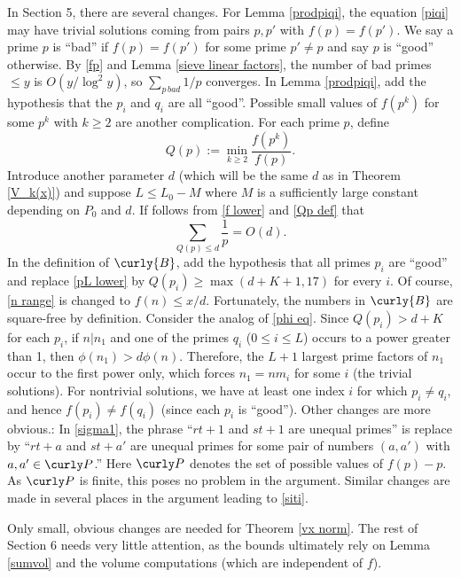\documentclass[11pt]{amsart}
\theoremstyle{remark}
\theoremstyle{plain}
\numberwithin{equation}{section}
\newcommand{\be}{\begin{equation}}
\newcommand{\ee}{\end{equation}}
\renewcommand{\(}{\left(}
\renewcommand{\)}{\right)}
\newcommand{\fancyB}{{\curly{B}}}
\renewcommand{\le}{\leqslant}
\renewcommand{\ge}{\geqslant}
\begin{document}
In Section 5, there are several changes.  For Lemma \ref{prodpiqi},
the equation \eqref{piqi} may have trivial solutions coming from pairs
$p,p'$ with $f(p)=f(p')$.
We say a prime $p$ is ``bad''
if $f(p)=f(p')$ for some prime $p'\ne p$ and say
$p$ is ``good'' otherwise.  By \eqref{fp} and Lemma
 \ref{sieve linear factors},
the number of bad primes $\le y$ is $O(y/\log^2 y)$, so
$\sum_{p\, bad} 1/p$ converges.  In Lemma \ref{prodpiqi}, add the hypothesis
that the $p_i$ and $q_i$ are all ``good''. 
Possible small values of $f(p^k)$ for some 
$p^k$ with $k\ge 2$ are another complication.  For each prime $p$, define
\be\label{Qp def}
Q(p) := \min_{k\ge 2} \frac{f(p^k)}{f(p)}.
\ee
Introduce another parameter $d$ (which will be the same $d$ as in Theorem
\ref{V_k(x)}) and suppose $L\le L_0-M$ where $M$ is a sufficiently large
constant depending on $P_0$ and $d$. 
If follows from \eqref{f lower} and \eqref{Qp def} that 
$$
\sum_{Q(p)\le d} \frac1{p} = O(d).
$$
In the definition of $\fancyB$, add the hypothesis that all primes
$p_i$ are ``good'' and replace \eqref{pL lower} by $Q(p_i) \ge \max(d+K+1,17)$
for every $i$.
Of course, \eqref{n range} is changed to $f(n) \le x/d$.
Fortunately, the numbers in $\fancyB$ are square-free by definition.
Consider the analog of \eqref{phi eq}. 
Since $Q(p_i)>d+K$ for each $p_i$,
if $n|n_1$ and one of the primes $q_i$ ($0\le i\le L$)
occurs to a power greater than 1, then
$\phi(n_1) > d\phi(n)$.  Therefore, the $L+1$ largest prime factors of
$n_1$ occur to the first power only, which forces $n_1=nm_i$ for
some $i$ (the trivial solutions).  For nontrivial solutions, we have
at least one index $i$ for which $p_i \ne q_i$, and hence $f(p_i)\ne f(q_i)$
(since each $p_i$ is ``good'').  Other changes are more obvious.: In \eqref{sigma1},
 the phrase
``$rt+1$ and $st+1$ are unequal primes'' is replace by ``$rt+a$ and
$st+a'$ are unequal primes for some pair of numbers $(a,a')$ with $a,a'
\in \curly P$.''   Here $\curly P$ denotes the set of possible
values of $f(p)-p$.
As $\curly P$ is finite, this poses
no problem in the argument.  Similar changes are made in several places in
the argument leading to \eqref{siti}.

Only small, obvious changes are needed for Theorem \ref{vx norm}.  The rest
of Section 6 needs very little attention, as the bounds ultimately rely on
Lemma \ref{sumvol} and the volume computations (which are independent of $f$).
\end{document}
